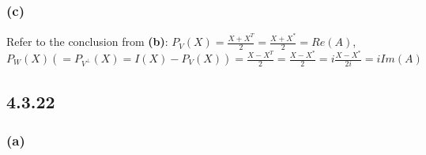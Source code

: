 \documentclass{article}
\begin{document}
\subsubsection*{(c)}

\noindent Refer to the conclusion from \textbf{(b)}: $P_V(X) = \frac {X + X ^ T} {2} = \frac {X + X ^ *} {2} = Re(A)$,  
$P_W(X) (= P_{V^\bot}(X) = I(X) - P_V(X)) = \frac {X - X ^ T} {2} = \frac {X - X ^ *} {2} = i \frac {X - X ^ *} {2i} = iIm(A)$

\subsection*{4.3.22}
\subsubsection*{(a)}
\end{document}
